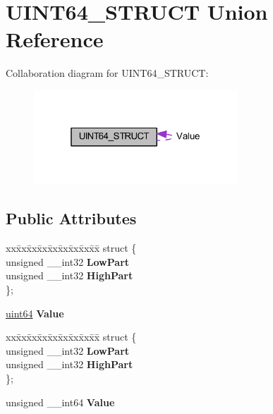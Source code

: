 \hypertarget{union_u_i_n_t64___s_t_r_u_c_t}{}\section{U\+I\+N\+T64\+\_\+\+S\+T\+R\+U\+CT Union Reference}
\label{union_u_i_n_t64___s_t_r_u_c_t}


Collaboration diagram for U\+I\+N\+T64\+\_\+\+S\+T\+R\+U\+CT\+:
\nopagebreak
\begin{figure}[H]
\begin{center}
\leavevmode
\includegraphics[width=217pt]{union_u_i_n_t64___s_t_r_u_c_t__coll__graph}
\end{center}
\end{figure}
\subsection*{Public Attributes}
\begin{DoxyCompactItemize}
\item 
\mbox{\label{union_u_i_n_t64___s_t_r_u_c_t_acc9197224a78a1affe2fa6edc662d4fa}} 
\begin{tabbing}
xx\=xx\=xx\=xx\=xx\=xx\=xx\=xx\=xx\=\kill
struct \{\\
\>unsigned \_\_int32 {\bfseries LowPart}\\
\>unsigned \_\_int32 {\bfseries HighPart}\\
\}; \\

\end{tabbing}\item 
\mbox{\label{union_u_i_n_t64___s_t_r_u_c_t_a5d34aa5477e5dbd315da02c4bdcbb83f}} 
\hyperlink{union_u_i_n_t64___s_t_r_u_c_t}{uint64} {\bfseries Value}
\item 
\mbox{\label{union_u_i_n_t64___s_t_r_u_c_t_accb9203e3f9f8cb54d01b743e9a095e6}} 
\begin{tabbing}
xx\=xx\=xx\=xx\=xx\=xx\=xx\=xx\=xx\=\kill
struct \{\\
\>unsigned \_\_int32 {\bfseries LowPart}\\
\>unsigned \_\_int32 {\bfseries HighPart}\\
\}; \\

\end{tabbing}\item 
\mbox{\label{union_u_i_n_t64___s_t_r_u_c_t_af457bdeb6253fecb50fb614bbe39b423}} 
unsigned \+\_\+\+\_\+int64 {\bfseries Value}
\end{DoxyCompactItemize}


